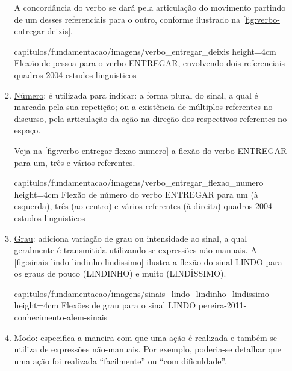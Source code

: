 \begin{enumerate}
\begin{enumerate}
                    A concordância do verbo se dará pela articulação do movimento partindo de um desses referenciais para o outro, conforme ilustrado na \autoref{fig:verbo-entregar-deixis}.

                    {capitulos/fundamentacao/imagens/verbo_entregar_deixis} %
                    {height=4cm} %
                    {Flexão de pessoa para o verbo ENTREGAR, envolvendo dois referenciais} %
                    {quadros-2004-estudos-linguisticos} %


              \item \underline{Número}: é utilizada para indicar: a forma plural do sinal, a qual é marcada pela sua repetição; ou a existência de múltiplos referentes no discurso, pela articulação da ação na direção dos respectivos referentes no espaço.

                    Veja na \autoref{fig:verbo-entregar-flexao-numero} a flexão do verbo ENTREGAR para um, três e vários referentes.

                    {capitulos/fundamentacao/imagens/verbo_entregar_flexao_numero} %
                    {height=4cm} %
                    {Flexão de número do verbo ENTREGAR para um (à esquerda), três (ao centro) e vários referentes (à direita)} %
                    {quadros-2004-estudos-linguisticos} %


              \item \underline{Grau}: adiciona variação de grau ou intensidade ao sinal, a qual geralmente é transmitida utilizando-se expressões não-manuais.
                    A \autoref{fig:sinais-lindo-lindinho-lindissimo} ilustra a flexão do sinal LINDO para os graus de pouco (LINDINHO) e muito (LINDÍSSIMO).

                    {capitulos/fundamentacao/imagens/sinais_lindo_lindinho_lindissimo} %
                    {height=4cm} %
                    {Flexões de grau para o sinal LINDO} %
                    {pereira-2011-conhecimento-alem-sinais} %


              \item \underline{Modo}: especifica a maneira com que uma ação é realizada e também se utiliza de expressões não-manuais.
                    Por exemplo, poderia-se detalhar que uma ação foi realizada ``facilmente'' ou ``com dificuldade''.



\end{enumerate}
\end{enumerate}
